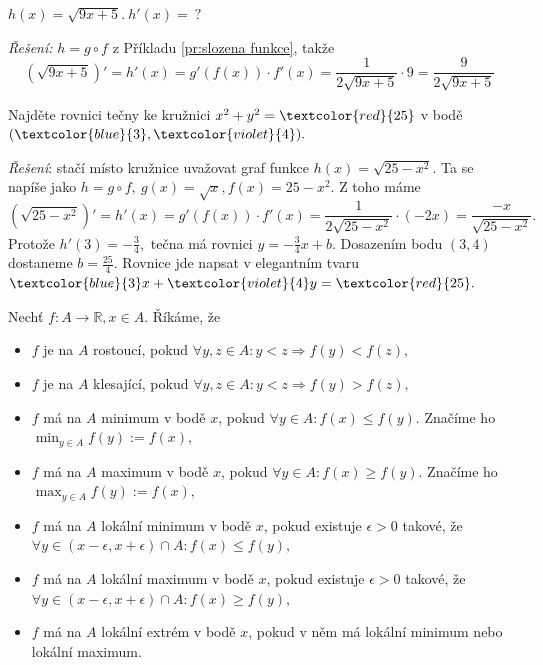 \begin{příklad}
  $h(x)=\sqrt{9x+5}.\ h'(x)=\ ?$\par
  \textit{Řešení:} $h=g\circ f$ z Příkladu \ref{pr:slozena funkce}, takže 
\begin{equation*}
  (\sqrt{9x+5})' = h'(x)=g'(f(x))\cdot f'(x)=\frac{1}{2 \sqrt{9x+5}}\cdot 9 = \frac{9}{2 \sqrt{9x+5}}
\end{equation*}
\end{příklad}

\begin{příklad}
	Najděte rovnici tečny ke kružnici $x^{2}+y^{2}=\textcolor{red}{25}$ v bodě $(\textcolor{blue}{3},\textcolor{violet}{4}).$\par
  \textit{Řešení}: stačí místo kružnice uvažovat graf funkce $h(x)=\sqrt{25-x^{2}}.$ Ta se napíše jako $h=g\circ f,\ g(x)=\sqrt{x}, f(x)=25-x^{2}.$ Z toho máme
  \begin{equation*}
	  (\sqrt{25-x^{2}})'=h'(x)=g'(f(x))\cdot f'(x)=\frac{1}{2 \sqrt{25-x^{2}}}\cdot (-2x) = \frac{-x}{\sqrt{25-x^{2}}}.
  \end{equation*}
  Protože $h'(3)=-\frac{3}{4},$ tečna má rovnici $y=-\frac{3}{4}x+b.$ Dosazením bodu $(3,4)$ dostaneme $b=\frac{25}{4}.$ Rovnice jde napsat v elegantním tvaru $\textcolor{blue}{3}x+\textcolor{violet}{4}y=\textcolor{red}{25}.$
\end{příklad}

\begin{definice}
  Nechť $f\colon A\to \mathbb{R}, x\in A.$ Říkáme, že
  \begin{itemize}
	  \item $f$ je na $A$ rostoucí, pokud $\forall y,z\in A\colon y<z \Rightarrow  f(y)<f(z),$
	  \item $f$ je na $A$ klesající, pokud $\forall y,z\in A\colon y<z \Rightarrow  f(y)>f(z),$
	  \item $f$ má na $A$ minimum v bodě $x$, pokud $\forall y\in A\colon f(x)\leq f(y).$ Značíme ho $\min_{y\in A}f(y):=f(x),$
	  \item $f$ má na $A$ maximum v bodě $x$, pokud $\forall y\in A\colon f(x)\geq f(y).$ Značíme ho $\max_{y\in A}f(y):=f(x),$
	  \item $f$ má na $A$ lokální minimum v bodě $x$, pokud existuje $\epsilon>0$ takové, že $\forall y\in(x-\epsilon,x+\epsilon)\cap A\colon f(x)\leq f(y),$
	  \item $f$ má na $A$ lokální maximum v bodě $x$, pokud existuje $\epsilon>0$ takové, že $\forall y\in(x-\epsilon,x+\epsilon)\cap A\colon f(x) \geq f(y),$
	  \item $f$ má na $A$ lokální extrém v bodě $x$, pokud v něm má lokální minimum nebo lokální maximum.
  \end{itemize}
\end{definice}

